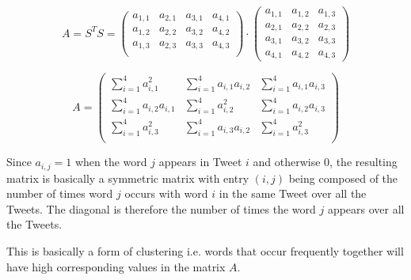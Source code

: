 \documentclass[11pt,a4paper]{article}
\begin{document}
\begin{equation}
A = S^TS =
 \left( \begin{matrix}
a_{1, 1} & a_{2, 1} & a_{3, 1} & a_{4, 1} \\ 
a_{1, 2} & a_{2, 2} & a_{3, 2} & a_{4, 2} \\ 
a_{1, 3} & a_{2, 3} & a_{3, 3} & a_{4, 3} \\ 

\end{matrix} \right)
\cdot \left( \begin{matrix}
a_{1, 1} & a_{1, 2} & a_{1, 3} \\ 
a_{2, 1} & a_{2, 2} & a_{2, 3} \\
a_{3, 1} & a_{3, 2} & a_{3, 3} \\
a_{4, 1} & a_{4, 2} & a_{4, 3} 
\end{matrix} \right)
\end{equation}


\begin{equation}
A =
\left( \begin{matrix}
\sum_{i=1}^4 a_{i,1}^2& \sum_{i=1}^4 a_{i,1} a_{i,2} &  \sum_{i=1}^4 a_{i,1} a_{i,3} \\ 
\sum_{i=1}^4 a_{i,2}a_{i, 1} & \sum_{i=1}^4 a_{i,2}^2 &  \sum_{i=1}^4 a_{i,2} a_{i,3} \\ 
\sum_{i=1}^4 a_{i,3}^2& \sum_{i=1}^4 a_{i,3} a_{i,2} &  \sum_{i=1}^4  a_{i,3}^2 \\ 
\end{matrix} \right)
\end{equation}

Since $a_{i, j} = 1$ when the word $j$ appears in Tweet $i$ and otherwise 0, the resulting matrix is basically a symmetric matrix with entry $(i, j)$ being composed of the number of times word $j$ occurs with word $i$ in the same Tweet over all the Tweets. The diagonal is  therefore the number of times the word $j$ appears over all the Tweets.

This is basically a form of clustering i.e. words that occur frequently together will have high corresponding values in the matrix $A$.  
\end{document}
